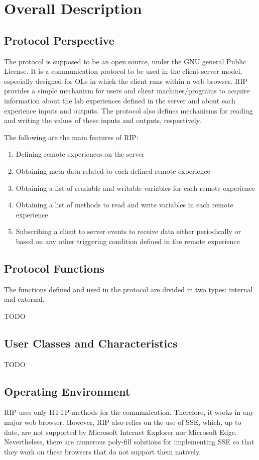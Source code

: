 \chapter{Overall Description}
\label{Overall Description}

\section{Protocol Perspective}
The protocol is supposed to be an open source, under the GNU general Public License. It is a communication protocol to be used in the client-server model, especially designed for OLs in which the client runs within a web browser. RIP provides a simple mechanism for users and client machines/programs to acquire information about the lab experiences defined in the server and about each experience inputs and outputs. The protocol also defines mechanisms for reading and writing the values of these inputs and outputs, respectively.

The following are the main features of RIP:

\begin{enumerate}
\item Defining remote experiences on the server
\item Obtaining meta-data related to each defined remote experience
\item Obtaining a list of readable and writable variables for each remote experience
\item Obtaining a list of methods to read and write variables in each remote experience
\item Subscribing a client to server events to receive data either periodically or based on any other triggering condition defined in the remote experience
\end{enumerate}

\section{Protocol Functions}
The functions defined and used in the protocol are divided in two types: internal and external.

TODO

\section{User Classes and Characteristics}
TODO

\section{Operating Environment}
RIP uses only HTTP methods for the communication. Therefore, it works in any major web browser. However, RIP also relies on the use of SSE, which, up to date, are not supported by Microsoft Internet Explorer nor Microsoft Edge. Nevertheless, there are numerous poly-fill solutions for implementing SSE so that they work on these browsers that do not support them natively.

